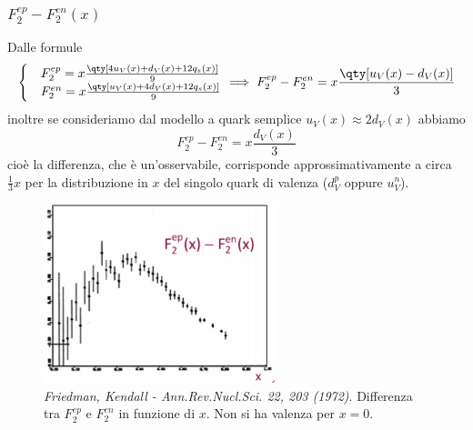 \subsubsection{$F_2^{ep}-F_2^{en}(x)$}
Dalle formule
\begin{equation*}
	\begin{cases}
&F_2^{ep}=x\frac{\qty[4u_V(x)+d_V(x)+12q_s(x)]}9\\
&F_2^{en}=x\frac{\qty[u_V(x)+4d_V(x)+12q_s(x)]}9
\end{cases}
\implies F_2^{ep}-F_2^{en}=x\frac{\qty[u_V(x)-d_V(x)]}3
\end{equation*}
inoltre se consideriamo dal modello a quark semplice $u_V(x)\approx2d_V(x)$ abbiamo
\begin{equation*}
    F_2^{ep}-F_2^{en}=x\frac{d_V(x)}3
\end{equation*}
cioè la differenza, che è un'osservabile, corrisponde approssimativamente a circa $\frac{1}{3}x$ per la distribuzione in $x$ del singolo quark di valenza ($d^p_V$ oppure $u^n_V$).
\begin{figure}[H]
    \centering
    \includegraphics[width=0.6\textwidth]{immagini/fig_diff_F_p_n.png}
    \caption{\textit{Friedman, Kendall - Ann.Rev.Nucl.Sci. 22, 203 (1972)}. Differenza tra $F_2^{ep}$ e $F_2^{en}$ in funzione di $x$. Non si ha valenza per $x=0$.}
\end{figure}

